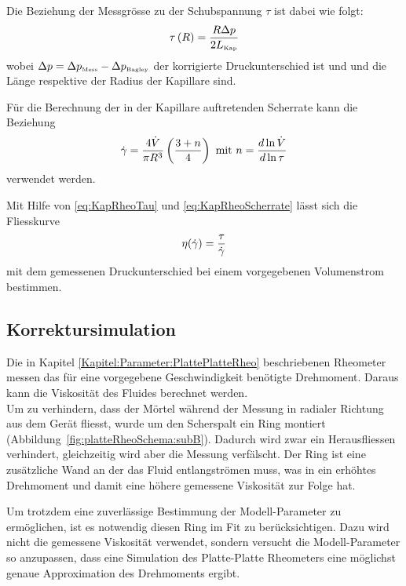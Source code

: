 Die Beziehung der Messgrösse  zu der Schubspannung $\tau$ ist dabei wie folgt:
\begin{equation}
    \label{eq:KapRheoTau}
    \tau\left( R \right) = \frac{R \Delta p}{2L_\text{\tiny Kap}}
\end{equation}
wobei $\Delta p = \Delta p_{\mbox{\tiny Mess}} -\Delta p_{\mbox{\tiny Bagley}}$ der korrigierte Druckunterschied ist und  und  die Länge respektive der Radius der Kapillare sind.

Für die Berechnung der in der Kapillare auftretenden Scherrate kann die Beziehung
\begin{equation}
    \label{eq:KapRheoScherrate}
    \dot\gamma = \frac{4 \dot{V}}{\pi R^3}\left( \frac{3+n}{4} \right) \mbox{ mit } n=\frac{d \ln \dot{V}}{d\ln\tau}
\end{equation}
verwendet werden. 

Mit Hilfe von \eqref{eq:KapRheoTau} und \eqref{eq:KapRheoScherrate} lässt sich die Fliesskurve 
\begin{equation}
    \eta(\dot\gamma) = \frac{\tau}{\dot\gamma}
\end{equation}
mit dem gemessenen Druckunterschied bei einem vorgegebenen Volumenstrom bestimmen.
%
%
\subsection{Korrektursimulation}
\label{Kapitel:Korrektursimulation}
Die in Kapitel \ref{Kapitel:Parameter:PlattePlatteRheo} beschriebenen Rheometer messen das für eine vorgegebene Geschwindigkeit benötigte Drehmoment. Daraus kann die Viskosität des Fluides berechnet werden.\\
Um zu verhindern, dass der Mörtel während der Messung in radialer Richtung aus dem Gerät fliesst, wurde um den Scherspalt ein Ring montiert (Abbildung~\ref{fig:platteRheoSchema:subB}). Dadurch wird zwar ein Herausfliessen verhindert, gleichzeitig wird aber die Messung verfälscht. Der Ring ist eine zusätzliche Wand an der das Fluid entlangströmen muss, was in ein erhöhtes Drehmoment und damit eine höhere gemessene Viskosität zur Folge hat.

Um trotzdem eine zuverlässige Bestimmung der Modell-Parameter zu ermöglichen, ist es notwendig diesen Ring im Fit zu berücksichtigen. Dazu wird nicht die gemessene Viskosität verwendet, sondern versucht die Modell-Parameter so anzupassen, dass eine Simulation des Platte-Platte Rheometers eine möglichst genaue Approximation des Drehmoments ergibt.

